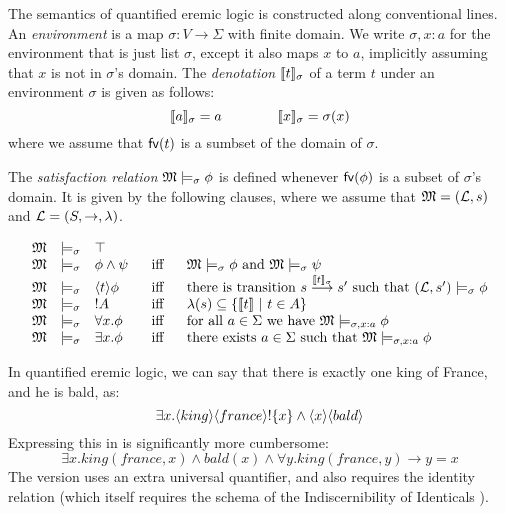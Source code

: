 \begin{definition}
The semantics of quantified eremic logic is constructed along
conventional lines. An \emph{environment} is a map $\sigma : V
\rightarrow \Sigma$ with finite domain.  We write $\sigma, x : a$ for
the environment that is just list $\sigma$, except it also maps $x$ to
$a$, implicitly assuming that $x$ is not in $\sigma$'s domain.  The
\emph{denotation} $\lbrack\!\lbrack t \rbrack\!\rbrack_{\sigma}$ of a term $t$ under an
environment $\sigma$ is given as follows:
\[
   \lbrack\!\lbrack a \rbrack\!\rbrack_{\sigma} = a
      \qquad\qquad
   \lbrack\!\lbrack x \rbrack\!\rbrack_{\sigma} = \sigma(x)
\]
where we assume that $\mathsf{fv}(t)$ is a sumbset of the domain of $\sigma$.

The \emph{satisfaction
  relation} $\frak{M} \models_{\sigma} \phi$ is defined whenever
$\mathsf{fv}(\phi)$ is a subset of $\sigma$'s domain. It is given by the
following clauses, where we assume that $\frak{M} = (\mathcal{L}, s)$ and $\mathcal{L} =
(S, \rightarrow, \lambda)$.

\[
\begin{array}{lclcl}
  \MMM & \models_{\sigma} & \top   \\
  \MMM & \models_{\sigma} & \phi \AND \psi &\ \mbox{ iff } \ & \MMM  \models_{\sigma} \phi \mbox { and } \MMM \models_{\sigma} \psi  \\
  \MMM & \models_{\sigma} & \langle t \rangle \phi & \mbox{ iff } & \text{there is transition } s \TRANS{\SEMB{t}_{\sigma}} s' \mbox { such that } (\LLL, s') \models_{\sigma} \phi  \\
  \MMM & \models_{\sigma} & \fBang A &\mbox{ iff } & \lambda(s) \subseteq \{\SEMB{t}\ |\ t \in A\} \\
  \MMM & \models_{\sigma} & \forall x.\phi &\mbox{ iff } & \text{for all} \ a \in \Sigma\ \text{we have}\ \MMM \models_{\sigma, x : a} \phi \\
  \MMM & \models_{\sigma} & \exists x.\phi &\mbox{ iff } & \text{there exists} \ a \in \Sigma \ \text{such that}\  \MMM \models_{\sigma, x : a} \phi
\end{array}
\]


\end{definition}

In quantified eremic logic, we can say that there is exactly one king of France, and he is bald, as:
\[
\exists x . \langle king \rangle \langle france \rangle ! \{x\} \land \langle x \rangle \langle bald \rangle \]
Expressing this in \fol{} is significantly more cumbersome:
\[
\exists x. king(france, x) \land bald(x) \land \forall y. king(france, y) \rightarrow y = x
\]
The \fol{} version uses an extra universal quantifier, and also requires the identity relation (which itself requires the schema of the Indiscernibility of Identicals ).

